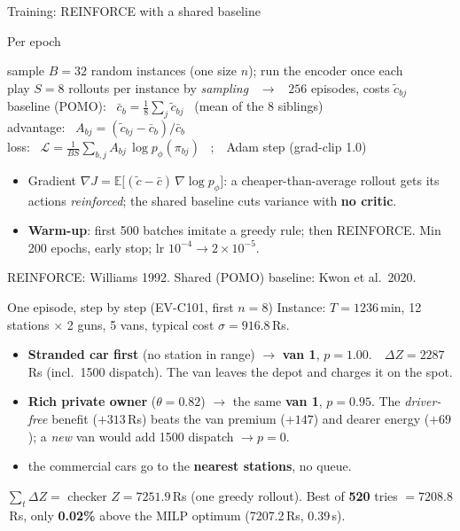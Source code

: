 \documentclass[aspectratio=169,11pt]{beamer}
\newcommand{\refline}[1]{{\scriptsize\color{black!55}\raggedright #1\par}}
\begin{document}
\begin{frame}{Training: REINFORCE with a shared baseline}
  {\footnotesize
  \begin{block}{Per epoch}
    \begin{flushleft}
    sample $B{=}32$ random instances (one size $n$); run the encoder once each\\
    play $S{=}8$ rollouts per instance by \emph{sampling} \ $\to$ \ $256$ episodes, costs $\tilde c_{bj}$\\
    baseline (POMO): \ $\bar c_b=\tfrac18\sum_j\tilde c_{bj}$ \ (mean of the 8 siblings)\\
    advantage: \ $A_{bj}=(\tilde c_{bj}-\bar c_b)/\bar c_b$\\
    loss: \ $\mathcal L=\tfrac{1}{BS}\sum_{b,j}A_{bj}\,\log p_\phi(\pi_{bj})$ \ ;\ \ Adam step (grad-clip 1.0)
    \end{flushleft}
  \end{block}
  \begin{itemize}
    \item Gradient $\nabla J=\mathbb E\big[(\tilde c-\bar c)\,\nabla\log p_\phi\big]$: a cheaper-than-average rollout gets its actions \emph{reinforced}; the shared baseline cuts variance with \textbf{no critic}.
    \item \textbf{Warm-up}: first 500 batches imitate a greedy rule; then REINFORCE. Min 200 epochs, early stop; lr $10^{-4}\!\to\!2\!\times\!10^{-5}$.
  \end{itemize}}
  \vspace{2pt}
  \refline{REINFORCE: Williams 1992. \quad Shared (POMO) baseline: Kwon et al.\ 2020.}
\end{frame}

\begin{frame}{One episode, step by step (EV-C101, first $n=8$)}
  {\footnotesize Instance: $T=1236$\,min, 12 stations $\times$ 2 guns, 5 vans, typical cost $\sigma=916.8$\,Rs.}
  \vspace{3pt}
  {\footnotesize
  \begin{itemize}
    \item[$t_1$] \textbf{Stranded car first} (no station in range) $\to$ \textbf{van 1}, $p=1.00$.\ \ $\Delta Z=2287$\,Rs (incl.\ 1500 dispatch). The van leaves the depot and charges it on the spot.
    \item[$t_3$] \textbf{Rich private owner} ($\theta=0.82$) $\to$ the same \textbf{van 1}, $p=0.95$. The \emph{driver-free} benefit ($+313$\,Rs) beats the van premium ($+147$) and dearer energy ($+69$); a \emph{new} van would add 1500 dispatch $\to p=0$.
    \item[rest] the commercial cars go to the \textbf{nearest stations}, no queue.
  \end{itemize}}
  \vspace{1pt}
  \begin{block}{}
    {\footnotesize $\sum_t\Delta Z=$ checker $Z=7251.9$\,Rs (one greedy rollout). Best of \textbf{520} tries $=7208.8$\,Rs, only \textbf{0.02\%} above the MILP optimum (7207.2\,Rs, 0.39\,s).}
  \end{block}
\end{frame}
\end{document}
